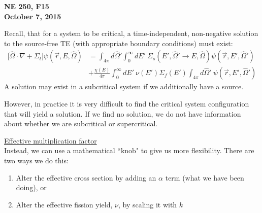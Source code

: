 \documentclass[12pt]{article}
\newcommand{\vOmega}{\ensuremath{\hat{\Omega}}}
\begin{document}
\begin{center}
{\bf NE 250, F15\\
October 7, 2015 
}
\end{center}

Recall, that for a system to be critical, a time-independent, non-negative solution to the source-free TE (with appropriate boundary conditions)  must exist:
\begin{align*}
\bigl[\vOmega \cdot \nabla + \Sigma_t\bigr] \psi(\vec{r}, E, \vOmega) &= \int_{4 \pi} d\vOmega' \int_0^{\infty} dE' \: \Sigma_s(E', \vOmega' \rightarrow E, \vOmega) \psi(\vec{r}, E', \vOmega')\\
 &+ \frac{\chi(E)}{4 \pi}\int_0^{\infty} dE' \: \nu(E') \Sigma_f(E') \int_{4 \pi} d\vOmega' \:\psi(\vec{r}, E', \vOmega')
\end{align*}
%
A solution may exist in a subcritical system if we additionally have a source.

However, in practice it is very difficult to find the critical system configuration that will yield a solution. If we find no solution, we do not have information about whether we are subcritical or supercritical.

\underline{Effective multiplication factor}\\
Instead, we can use a mathematical ``knob" to give us more flexibility. There are two ways we do this:
\begin{enumerate}
\item Alter the effective cross section by adding an $\alpha$  term (what we have been doing), or
\item Alter the effective fission yield, $\nu$, by scaling it with $k$
\end{enumerate}
\end{document}
